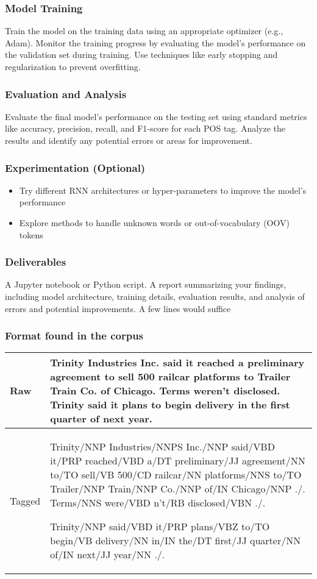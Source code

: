 \subsubsection{Model Training}
Train the model on the training data using an appropriate optimizer (e.g., Adam).
Monitor the training progress by evaluating the model's performance on the validation set during training.
Use techniques like early stopping and regularization to prevent overfitting.
\subsubsection{Evaluation and Analysis}
Evaluate the final model's performance on the testing set using standard metrics like accuracy, precision, recall, and F1-score for each POS tag.
Analyze the results and identify any potential errors or areas for improvement.
\subsubsection{Experimentation (Optional)}
\begin{itemize}
    \item Try different RNN architectures or hyper-parameters to improve the model's performance
    \item Explore methods to handle unknown words or out-of-vocabulary (OOV) tokens
\end{itemize}

\subsubsection{Deliverables}
A Jupyter notebook or Python script.
A report summarizing your findings, including model architecture, training details, evaluation results, and analysis of errors and potential improvements. A few lines would suffice

\subsubsection{Format found in the  corpus}
\begin{tabular}{|>{\centering\arraybackslash}m{2.5cm}|>{\raggedright\arraybackslash}m{15.5cm}|}
    \hline
    Raw&Trinity Industries Inc. said it reached a preliminary agreement to sell 500 railcar platforms to Trailer Train Co. of Chicago.
    Terms weren't disclosed.
    Trinity said it plans to begin delivery in the first quarter of next year.
    \\
    \hline

    Tagged&Trinity/NNP Industries/NNPS Inc./NNP
    said/VBD
    it/PRP
    reached/VBD
    a/DT preliminary/JJ agreement/NN
    to/TO sell/VB
    500/CD railcar/NN platforms/NNS
    to/TO
    Trailer/NNP Train/NNP Co./NNP
    of/IN
    Chicago/NNP
    ./.
    Terms/NNS
    were/VBD n't/RB disclosed/VBN ./.

    Trinity/NNP
    said/VBD
    it/PRP
    plans/VBZ to/TO begin/VB
    delivery/NN
    in/IN
    the/DT first/JJ quarter/NN
    of/IN
    next/JJ year/NN
    ./. \\
    \hline
\end{tabular}

